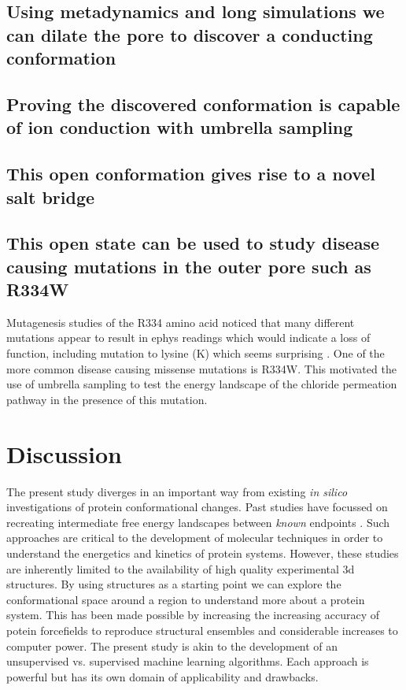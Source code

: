 \subsection{Using metadynamics and long simulations we can dilate the pore to discover a conducting conformation}

\subsection{Proving the discovered conformation is capable of ion conduction with umbrella sampling}

\subsection{This open conformation gives rise to a novel salt bridge}
\label{salt_bridge}

\subsection{This open state can be used to study disease causing mutations in the outer pore such as R334W}
Mutagenesis studies of the R334 amino acid noticed that many different mutations appear to result in ephys readings which would indicate a loss of function, including mutation to lysine (K) which seems surprising \cite{ge2004, gong2004, linsdell2021}. One of the more common disease causing missense mutations is R334W. This motivated the use of umbrella sampling to test the energy landscape of the chloride permeation pathway in the presence of this mutation. 

\section{Discussion}

The present study diverges in an important way from existing \textit{in silico} investigations of protein conformational changes. Past studies have focussed on recreating intermediate free energy landscapes between \textit{known} endpoints \cite{lev2020, bergh2021}. Such approaches are critical to the development of molecular techniques in order to understand the energetics and kinetics of protein systems. However, these studies are inherently limited to the availability of high quality experimental 3d structures. By using structures as a starting point we can explore the conformational space around a region to understand more about a protein system. This has been made possible by increasing the increasing accuracy of potein forcefields to reproduce structural ensembles \cite{huang2017} and considerable increases to computer power. The present study is akin to the development of an unsupervised vs. supervised machine learning algorithms. Each approach is powerful but has its own domain of applicability and drawbacks. 

